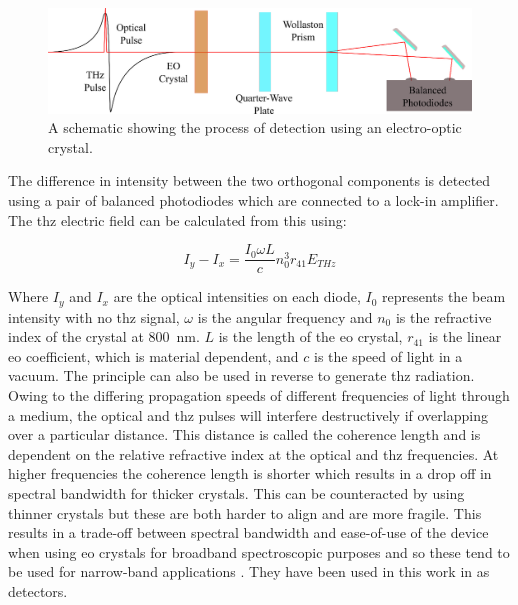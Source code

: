 \begin{figure}[b]
    \centering
    \includegraphics[scale=0.9]{Figures/Misc/Theory/EODetection.png}
    \captionsetup{font = footnotesize, justification = centering}
    \caption[A Schematic showing the Process of Detection using an Electro-Optic Crystal]{A schematic showing the process of detection using an electro-optic crystal.}
    \label{fig:EO_Detection}
\end{figure}

The difference in intensity between the two orthogonal components is detected using a pair of balanced photodiodes which are connected to a lock\nobreakdash-in amplifier. The \acrshort{thz} electric field can be calculated from this using:

\begin{equation}
I_y - I_x = \frac{I_0 \omega L}{c} n_0^3 r_{41} E_{THz}
\end{equation}

Where \(I_y\) and \(I_x\) are the optical intensities on each diode, \(I_0\) represents the beam intensity with no \acrshort{thz} signal, \(\omega\) is the angular frequency and \(n_0\) is the refractive index of the crystal at \SI{800}{nm}. \(L\) is the length of the \acrshort{eo} crystal, \(r_{41}\) is the linear \acrshort{eo} coefficient, which is material dependent, and \(c\) is the speed of light in a vacuum. The principle can also be used in reverse to generate \acrshort{thz} radiation. Owing to the differing propagation speeds of different frequencies of light through a medium, the optical and \acrshort{thz} pulses will interfere destructively if overlapping over a particular distance. This distance is called the coherence length and is dependent on the relative refractive index at the optical and \acrshort{thz} frequencies. At higher frequencies the coherence length is shorter which results in a drop off in spectral bandwidth for thicker crystals. This can be counteracted by using thinner crystals but these are both harder to align and are more fragile. This results in a trade\nobreakdash-off between spectral bandwidth and ease\nobreakdash-of\nobreakdash-use of the device when using \acrshort{eo} crystals for broadband spectroscopic purposes and so these tend to be used for narrow-band applications \cite{Watanabe2018}. They have been used in this work in  as detectors.

